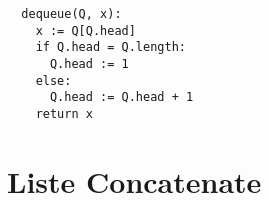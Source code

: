 \begin{lstlisting}
  dequeue(Q, x):
    x := Q[Q.head]
    if Q.head = Q.length:
      Q.head := 1
    else:
      Q.head := Q.head + 1
    return x
\end{lstlisting}

\section{Liste Concatenate}


